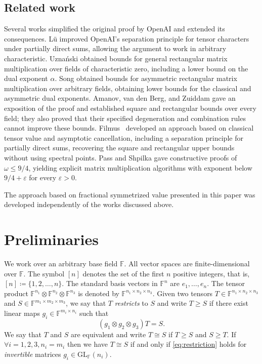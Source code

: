 \documentclass[11pt,letterpaper]{article}
\numberwithin{equation}{section}
\newcommand{\GL}{\mathrm{GL}}
\newcommand{\FF}{\mathbb{F}}
\begin{document}
\subsection{Related work}
Several works simplified the original proof by OpenAI and extended its consequences.
L\"{u} \cite{Lu-26} improved OpenAI's separation principle for tensor characters under partially direct sums, allowing the argument to work in arbitrary characteristic.
Uzna\'{n}ski \cite{Uznanski-26} obtained bounds for general rectangular matrix multiplication over fields of characteristic zero, including a lower bound on the dual exponent $\alpha$.
Song \cite{Song-26} obtained bounds for asymmetric rectangular matrix multiplication over arbitrary fields, obtaining lower bounds for the classical and asymmetric dual exponents.
Amanov, van den Berg, and Zuiddam \cite{ABZ-26} gave an exposition of the proof and established square and rectangular bounds over every field; they also proved that their specified degeneration and combination rules cannot improve these bounds.
Filmus~\cite{Filmus-26} developed an approach based on classical tensor value and asymptotic cancellation, including a separation principle for partially direct sums, recovering the square and rectangular upper bounds without using spectral points.
Pass \cite{Pass-26} and Shpilka \cite{Shpilka-26} gave constructive proofs of $\omega\leq 9/4$, yielding explicit matrix multiplication algorithms with exponent below $9/4+\varepsilon$ for every $\varepsilon>0$.

The approach based on fractional symmetrized value presented in this paper was developed independently of the works discussed above.



\section{Preliminaries}

We work over an arbitrary base field $\FF$.
All vector spaces are finite-dimensional over $\FF$.
The symbol $[n]$ denotes the set of the first $n$ positive integers, that is, $[n] \coloneqq \{1, 2, \dots, n\}$.
The standard basis vectors in $\FF^{n}$ are $e_1, \dots, e_{n}$.
The tensor product $\FF^{n_1} \otimes \FF^{n_2} \otimes \FF^{n_3}$ is denoted by $\FF^{n_1 \times n_2 \times n_3}$.
Given two tensors $T\in\FF^{n_1\times n_2\times n_3}$ and $S\in \FF^{m_1\times m_2\times m_3}$, we say that $T$ \emph{restricts} to $S$ and write $T\geq S$ if there exist linear maps $g_i\in\FF^{m_i\times n_i}$ such that \begin{equation}
\label{eq:restriction}
(g_1 \otimes g_2\otimes g_3) T =S.
\end{equation} We say that $T$ and $S$ are equivalent and write $T\cong S$ if $T\geq S$ and $S\geq T$.
If $\forall i=1,2,3, n_i=m_i$ then we have $T\cong S$ if and only if \cref{eq:restriction} holds for \emph{invertible} matrices $g_i\in\GL_{\FF}(n_i)$.
\end{document}
